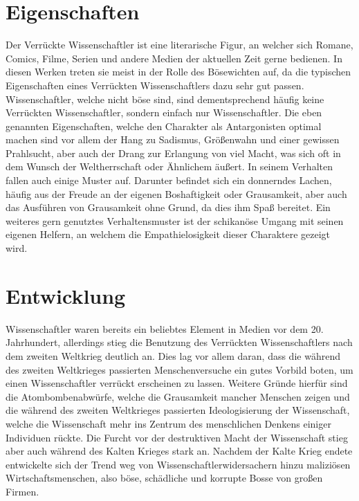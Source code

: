 \documentclass[12pt]{scrreprt}
\begin{document}
\section{Eigenschaften}
	\label{sec:eigenschaften}
Der Verrückte Wissenschaftler ist eine literarische Figur, an welcher sich Romane, Comics, Filme, Serien und andere Medien der aktuellen Zeit gerne bedienen.
In diesen Werken treten sie meist in der Rolle des Bösewichten auf, da die typischen Eigenschaften eines Verrückten Wissenschaftlers dazu sehr gut passen.
Wissenschaftler, welche nicht böse sind, sind dementsprechend häufig keine Verrückten Wissenschaftler, sondern einfach nur Wissenschaftler. 
Die eben genannten Eigenschaften, welche den Charakter als Antargonisten optimal machen sind vor allem der Hang zu Sadismus, Größenwahn und einer gewissen Prahlsucht, aber auch der Drang zur Erlangung von viel Macht, was sich oft in dem Wunsch der Weltherrschaft oder Ähnlichem äußert.
In seinem Verhalten fallen auch einige Muster auf.
Darunter befindet sich ein donnerndes Lachen, häufig aus der Freude an der eigenen Boshaftigkeit oder Grausamkeit, aber auch das Ausführen von Grausamkeit ohne Grund, da dies ihm Spaß bereitet.
Ein weiteres gern genutztes Verhaltensmuster ist der schikanöse Umgang mit seinen eigenen Helfern, an welchem die Empathielosigkeit dieser Charaktere gezeigt wird.
\autocite{wiki:Verrückter_Wissenschaftler}
\section{Entwicklung}
	\label{sec:entwicklung}
Wissenschaftler waren bereits ein beliebtes Element in Medien vor dem 20. Jahrhundert, allerdings stieg die Benutzung des Verrückten Wissenschaftlers nach dem zweiten Weltkrieg deutlich an.
Dies lag vor allem daran, dass die während des zweiten Weltkrieges passierten Menschenversuche ein gutes Vorbild boten, um einen Wissenschaftler verrückt erscheinen zu lassen.
Weitere Gründe hierfür sind die Atombombenabwürfe, welche die Grausamkeit mancher Menschen zeigen und die während des zweiten Weltkrieges passierten Ideologisierung der Wissenschaft, welche die Wissenschaft mehr ins Zentrum des menschlichen Denkens einiger Individuen rückte.
Die Furcht vor der destruktiven Macht der Wissenschaft stieg aber auch während des Kalten Krieges stark an.
Nachdem der Kalte Krieg endete entwickelte sich der Trend weg von Wissenschaftlerwidersachern hinzu maliziösen Wirtschaftsmenschen, also böse, schädliche und korrupte Bosse von großen Firmen.
\autocite{wiki:Verrückter_Wissenschaftler}
\end{document}
